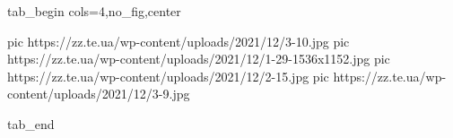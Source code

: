  
 
 
 
 


\ifcmt
  tab_begin cols=4,no_fig,center

     pic https://zz.te.ua/wp-content/uploads/2021/12/3-10.jpg
		 pic https://zz.te.ua/wp-content/uploads/2021/12/1-29-1536x1152.jpg
		 pic https://zz.te.ua/wp-content/uploads/2021/12/2-15.jpg
		 pic https://zz.te.ua/wp-content/uploads/2021/12/3-9.jpg

  tab_end
\fi
